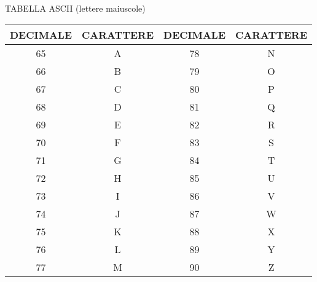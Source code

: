\documentclass[aspectratio=1610]{beamer}
\begin{document}
\begin{frame}{TABELLA ASCII (lettere maiuscole)}
    \centering
    \begin{tabular}{c|c||c|c}
        \textbf{DECIMALE} & \textbf{CARATTERE} & \textbf{DECIMALE} & \textbf{CARATTERE} \\
        \hline
        \hline
        65 & A & 78 & N \\
        \hline
        66 & B & 79 & O \\
        \hline
        67 & C & 80 & P \\
        \hline
        68 & D & 81 & Q \\
        \hline
        69 & E & 82 & R \\
        \hline
        70 & F & 83 & S \\
        \hline
        71 & G & 84 & T \\
        \hline
        72 & H & 85 & U \\
        \hline
        73 & I & 86 & V \\
        \hline
        74 & J & 87 & W \\
        \hline
        75 & K & 88 & X \\
        \hline
        76 & L & 89 & Y \\
        \hline
        77 & M & 90 & Z \\
    \end{tabular}
\end{frame}
\end{document}
